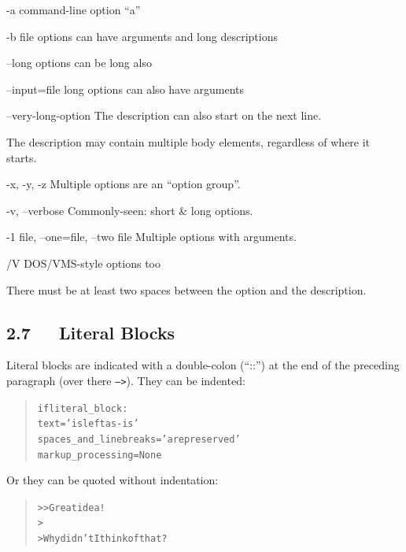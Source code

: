 \documentclass[a4paper]{article}
\providecommand*{\DUoptionlistlabel}[1]{\bf #1 \hfill}
\newenvironment{DUoptionlist}{%
    \list{}{\setlength{\labelwidth}{\DUoptionlistindent}
            \setlength{\rightmargin}{1cm}
            \setlength{\leftmargin}{\rightmargin}
            \addtolength{\leftmargin}{\labelwidth}
            \addtolength{\leftmargin}{\labelsep}
            \renewcommand{\makelabel}{\DUoptionlistlabel}}
  }
  {\endlist}
\begin{document}
\begin{DUoptionlist}
\item[-a]  command-line option “a”

\item[-b file]  options can have arguments
and long descriptions

\item[--long]  options can be long also

\item[--input=file]  long options can also have
arguments

\item[--very-long-option]  The description can also start on the next line.

The description may contain multiple body elements,
regardless of where it starts.

\item[-x, -y, -z]  Multiple options are an “option group”.

\item[-v, --verbose]  Commonly-seen: short \& long options.

\item[-1 file, --one=file, --two file]  Multiple options with arguments.

\item[/V]  DOS/VMS-style options too
\end{DUoptionlist}

There must be at least two spaces between the option and the
description.


\subsection{2.7   Literal Blocks%
  \label{literal-blocks}%
}

Literal blocks are indicated with a double-colon (“::”) at the end of
the preceding paragraph (over there \texttt{-->}).  They can be indented:

\begin{quote}
\begin{alltt}
if literal_block:
    text = 'is left as-is'
    spaces_and_linebreaks = 'are preserved'
    markup_processing = None
\end{alltt}
\end{quote}

Or they can be quoted without indentation:

\begin{quote}
\begin{alltt}
>> Great idea!
>
> Why didn't I think of that?
\end{alltt}
\end{quote}
\end{document}
